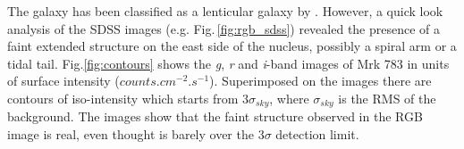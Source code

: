\documentclass[../main.tex]{subfiles}
\begin{document}
The galaxy has been classified as a lenticular galaxy by \citep{Petrosian07}.
However, a quick look analysis of the SDSS images (e.g. Fig.\,\ref{fig:rgb_sdss}) revealed the presence of a faint extended structure on the east side of the nucleus, possibly a spiral arm or a tidal tail.
Fig.\ref{fig:contours} shows the \emph{g}, \emph{r} and \emph{i}-band images of Mrk 783 in units of surface intensity ($\si{counts.cm^{-2}.s^{-1}}$).
Superimposed on the images there are contours of iso-intensity which starts from $3\sigma_{sky}$, where $\sigma_{sky}$ is the RMS of the background.
The images show that the faint structure observed in the RGB image is real, even thought is barely over the $3\sigma$ detection limit.




\end{document}
